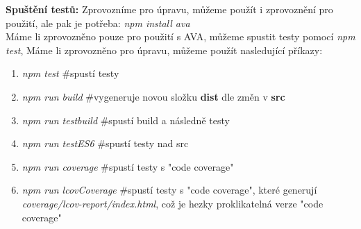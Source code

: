 \textbf{Spuštění testů:}
Zprovozníme pro úpravu, můžeme použít i zprovoznění pro použití, ale pak je potřeba: \textit{npm install ava}\\
Máme li zprovozněno pouze pro použití s AVA, můžeme spustit testy pomocí \textit{npm test}, Máme li zprovozněno pro úpravu, můžeme použít nasledující příkazy:
\begin{enumerate}
	\item \textit{npm test} \#spustí testy
	\item \textit{npm run build} \#vygeneruje novou složku \textbf{dist} dle změn v \textbf{src}
	\item \textit{npm run testbuild} \#spustí build a následně testy
	\item \textit{npm run testES6} \#spustí testy nad src
	\item \textit{npm run coverage} \#spustí testy s "code coverage"
	\item \textit{npm run lcovCoverage} \#spustí testy s "code coverage", které generují \textit{coverage/lcov-report/index.html}, což je hezky proklikatelná verze "code coverage"
\end{enumerate}